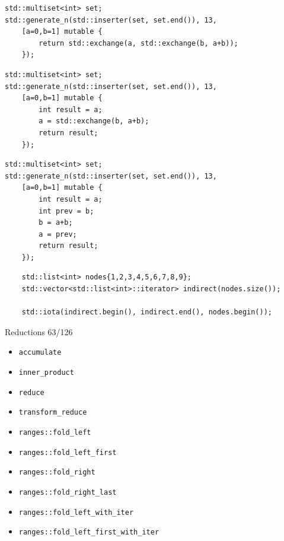 \documentclass[aspectratio=169]{beamer}
\begin{document}
\begin{frame}[fragile]{}
\begin{overprint}
\begin{verbatim}
std::multiset<int> set;
std::generate_n(std::inserter(set, set.end()), 13,
    [a=0,b=1] mutable {
        return std::exchange(a, std::exchange(b, a+b));
    });
\end{verbatim}
\begin{verbatim}
std::multiset<int> set;
std::generate_n(std::inserter(set, set.end()), 13,
    [a=0,b=1] mutable {
        int result = a;
        a = std::exchange(b, a+b);
        return result;
    });
\end{verbatim}
\begin{verbatim}
std::multiset<int> set;
std::generate_n(std::inserter(set, set.end()), 13,
    [a=0,b=1] mutable {
        int result = a;
        int prev = b;
        b = a+b;
        a = prev;
        return result;
    });
\end{verbatim}
\end{overprint}
\end{frame}

\begin{frame}[fragile]{}
  \begin{verbatim}
    std::list<int> nodes{1,2,3,4,5,6,7,8,9};
    std::vector<std::list<int>::iterator> indirect(nodes.size());

    std::iota(indirect.begin(), indirect.end(), nodes.begin());
  \end{verbatim}
\end{frame}

\begin{frame}{Reductions 63/126}
  \begin{itemize}
    \item{\texttt{accumulate}}
    \item{\texttt{inner_product}}
    \item{\texttt{reduce}}
    \item{\texttt{transform_reduce}}
    \item{\texttt{ranges::fold_left}}
    \item{\texttt{ranges::fold_left_first}}
    \item{\texttt{ranges::fold_right}}
    \item{\texttt{ranges::fold_right_last}}
    \item{\texttt{ranges::fold_left_with_iter}}
    \item{\texttt{ranges::fold_left_first_with_iter}}
  \end{itemize}
\end{frame}
\end{document}
